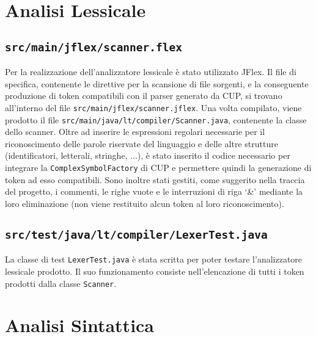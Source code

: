 \documentclass[10pt,a4paper]{article}
\begin{document}
\section{Analisi Lessicale}

\subsection{\texttt{src/main/jflex/scanner.flex}}
Per la realizzazione dell'analizzatore lessicale è stato utilizzato JFlex. Il file di specifica, contenente le direttive per la scansione di file sorgenti, e la conseguente produzione di token compatibili con il parser generato da CUP, si trovano all'interno del file \texttt{src/main/jflex/scanner.jflex}. Una volta compilato, viene prodotto il file \texttt{src/main/java/lt/compiler/Scanner.java}, contenente la classe dello scanner. Oltre ad inserire le espressioni regolari necessarie per il riconoscimento delle parole riservate del linguaggio e delle altre strutture (identificatori, letterali, stringhe, ...), è stato inserito il codice necessario per integrare la \texttt{ComplexSymbolFactory} di CUP e permettere quindi la generazione di token ad esso compatibili. Sono inoltre stati gestiti, come suggerito nella traccia del progetto, i commenti, le righe vuote e le interruzioni di riga `\&' mediante la loro eliminazione (non viene restituito alcun token al loro riconoscimento).

\subsection{\texttt{src/test/java/lt/compiler/LexerTest.java}}
La classe di test \texttt{LexerTest.java} è stata scritta per poter testare l'analizzatore lessicale prodotto. Il suo funzionamento consiste nell'elencazione di tutti i token prodotti dalla classe \texttt{Scanner}.

\pagebreak

\section{Analisi Sintattica} \label{analisiSintattica}
\end{document}
